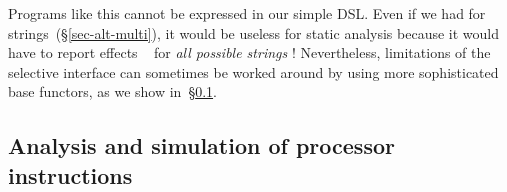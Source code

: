 \noindent
Programs like this cannot be expressed in our simple  DSL. Even if
we had  for strings~(\S\ref{sec-alt-multi}), it would be useless for
static analysis because it would have to report effects ~ for
\emph{all possible strings} ! Nevertheless, limitations of the
selective interface can sometimes be worked around by using more sophisticated
base functors, as we show in~\S\ref{sec-free-isa}.







\subsection{Analysis and simulation of processor instructions}\label{sec-free-isa}

